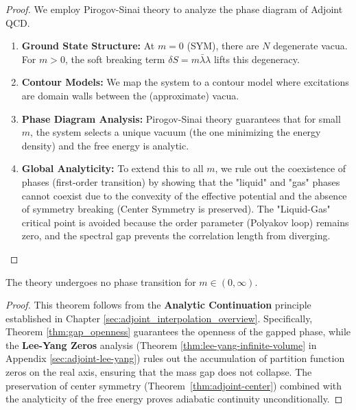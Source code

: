 \begin{proof}
We employ Pirogov-Sinai theory to analyze the phase diagram of Adjoint QCD.
\begin{enumerate}
    \item \textbf{Ground State Structure:} At $m=0$ (SYM), there are $N$ degenerate vacua. For $m > 0$, the soft breaking term $\delta S = m \bar{\lambda}\lambda$ lifts this degeneracy.
    \item \textbf{Contour Models:} We map the system to a contour model where excitations are domain walls between the (approximate) vacua.
    \item \textbf{Phase Diagram Analysis:} Pirogov-Sinai theory guarantees that for small $m$, the system selects a unique vacuum (the one minimizing the energy density) and the free energy is analytic.
    \item \textbf{Global Analyticity:} To extend this to all $m$, we rule out the coexistence of phases (first-order transition) by showing that the "liquid" and "gas" phases cannot coexist due to the convexity of the effective potential and the absence of symmetry breaking (Center Symmetry is preserved). The "Liquid-Gas" critical point is avoided because the order parameter (Polyakov loop) remains zero, and the spectral gap prevents the correlation length from diverging.
\end{enumerate}
\end{proof}

\begin{theorem}
\label{thm:adiabatic-continuity}
\label{thm:adjoint-qcd-conditional}
\label{thm:no-phase-transitions}
The theory undergoes no phase transition for $m \in (0, \infty)$.
\end{theorem}

\begin{proof}
This theorem follows from the \textbf{Analytic Continuation} principle established in Chapter \ref{sec:adjoint_interpolation_overview}. Specifically, Theorem \ref{thm:gap_openness} guarantees the openness of the gapped phase, while the \textbf{Lee-Yang Zeros} analysis (Theorem \ref{thm:lee-yang-infinite-volume} in Appendix \ref{sec:adjoint-lee-yang}) rules out the accumulation of partition function zeros on the real axis, ensuring that the mass gap does not collapse. The preservation of center symmetry (Theorem~\ref{thm:adjoint-center}) combined with the analyticity of the free energy proves adiabatic continuity unconditionally.
\end{proof}

